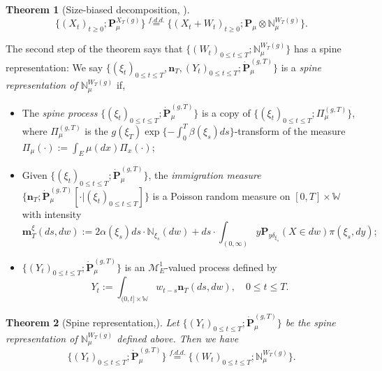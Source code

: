 \documentclass[12pt, a4paper]{amsart}
\newtheorem{thm}{Theorem}[section]
\theoremstyle{definition}
\numberwithin{equation}{section}
\begin{document}
\begin{thm}[Size-biased decomposition,  \cite{RenSongSun2017Spine}]\label{thm: size-biased decomposition}
\begin{equation}
	\{(X_t)_{t\geq 0}; \mathbf P_\mu^{X_T(g)}\}
	\overset{f.d.d.}{=} \{(X_t+W_t)_{t\geq 0}; \mathbf P_\mu  \otimes \mathbb N^{W_T(g)}_\mu\}.
\end{equation}
\end{thm}
	The second step of the theorem says that $\{(W_t)_{0\leq t\leq T}; \mathbb N^{W_T(g)}_\mu\}$ has a spine representation:
	We say $\{(\xi_t)_{0\leq t\leq T}, \mathbf n_T,  (Y_t)_{ 0\leq t\leq T}; \dot {\mathbf P}^{(g,T)}_\mu\}$ is a \emph{spine representation of $\mathbb N^{W_T(g)}_\mu$}  if,
\begin{itemize}
\item
	The \emph{spine process} $\{(\xi_t)_{0\leq t\leq T}; \dot{\mathbf P}^{(g,T)}_\mu\}$ is a copy of $\{(\xi_t)_{0\leq t\leq T}; \Pi^{(g,T)}_{\mu}\}$, where $\Pi^{(g,T)}_{\mu}$ is the $g(\xi_T) \exp\{-\int_0^T \beta(\xi_s)ds\}$-transform of the measure $\Pi_{\mu}(\cdot):=\int_{E}\mu(dx)\Pi_x(\cdot) $;
\item
	Given $\{(\xi_t)_{0\leq t\leq T}; \dot{\mathbf P}^{(g,T)}_\mu\}$, the \emph{immigration measure} $\{\mathbf n_T; \dot{\mathbf P}^{(g,T)}_\mu[\cdot |(\xi_t)_{0\leq t\leq T}]\}$ is a Poisson random measure on $[0,T] \times \mathbb W$ with intensity
\begin{equation}
	\mathbf m^\xi_T(ds,dw)
	:= 2 \alpha(\xi_s) ds \cdot \mathbb N_{\xi_s}(dw) + ds \cdot \int_{(0,\infty)} y \mathbf P_{y\delta_{\xi_s}}(X\in dw) \pi(\xi_s,dy);
\end{equation}
\item
	$\{(Y_t)_{0\leq t\leq T}; \dot{\mathbf P}^{(g,T)}_\mu\}$ is an $\mathcal M^1_E$-valued process defined by
\begin{equation}
	Y_t
	:= \int_{(0,t] \times \mathbb W} w_{t-s} \mathbf n_T(ds,dw),
	\quad 0 \leq t\leq T.
\end{equation}
\end{itemize}

\begin{thm}[Spine representation,\cite{RenSongSun2017Spine}]\label{thm: spine representation}
	Let $\{(Y_t)_{0\leq t\leq T}; \dot {\mathbf P}^{(g,T)}_\mu\}$ be the spine representation of $\mathbb N^{W_T(g)}_\mu$ defined above.
	Then we have
\begin{equation}
	\{(Y_t)_{0\leq t\leq T}; \dot{\mathbf P}^{(g,T)}_\mu\}
	\overset{f.d.d.}{=} \{(W_t)_{0\leq t\leq T}; \mathbb N_\mu^{W_T(g)}\}.
\end{equation}
\end{thm}
\end{document}
